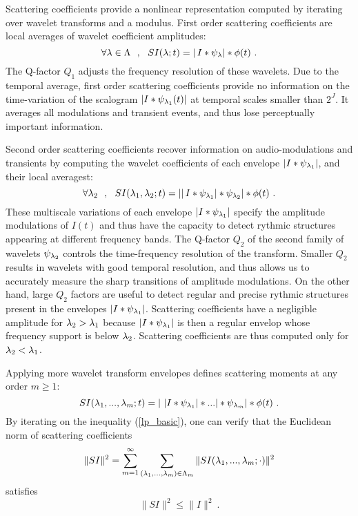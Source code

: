Scattering coefficients provide a nonlinear representation 
computed by 
iterating over wavelet transforms and a modulus. 
First order scattering coefficients
are local averages of wavelet coefficient amplitudes:
\[
\forall {\lambda} \in {\Lambda}~~,~~S I({\lambda}; t) = |\, I \ast \psi_{\lambda}| \ast \phi(t)~. 
\]
The Q-factor $Q_1$ adjusts the frequency resolution of 
these wavelets. Due to the temporal average, first order scattering coefficients 
provide no information on the time-variation of the scalogram
$|I \ast \psi_{{\lambda}_1} (t)|$ at temporal scales smaller than $2^J$. 
It averages all modulations and 
transient events, and thus lose perceptually important information.
 
Second order scattering coefficients recover information on
audio-modulations and transients by computing
the wavelet coefficients of each envelope $|I \ast \psi_{{\lambda}_1}|$, and their
local averagest:
\[
\forall {\lambda}_2~~,~~
S I({\lambda}_1,{\lambda}_2; t) = ||\, I \ast \psi_{{\lambda}_1}| \ast \psi_{{\lambda}_2}| \ast \phi(t)~ .
\]
These multiscale variations of each envelope $|I \ast \psi_{{\lambda}_1}|$ 
specify the amplitude modulations of $I(t)$ \cite{deepscatt} and 
thus have the capacity to detect rythmic structures appearing at different 
frequency bands. 
The Q-factor $Q_2$ of the second family of wavelets $\psi_{{\lambda}_2}$ 
controls the time-frequency resolution of the transform. Smaller $Q_2$ 
results in wavelets with good temporal resolution, and thus
allows us to accurately measure the sharp transitions of
amplitude modulations. On the other hand,  large $Q_2$ factors 
are useful to detect regular and precise rythmic structures present in the 
envelopes $| I \ast \psi_{{\lambda}_1}|$.
Scattering coefficients have a negligible amplitude for
${\lambda}_2 > {\lambda}_1$ because $|I \ast \psi_{{\lambda}_1}|$ is then a regular envelop
whose frequency support is below ${\lambda}_2$. Scattering coefficients are thus
computed only for ${\lambda}_2 < {\lambda}_1$. 

Applying more wavelet transform envelopes defines
scattering moments at any order $m \geq 1$:
\begin{equation}
\label{expansdf}
S I({\lambda}_1,...,{\lambda}_m; t) =  |~|I \ast \psi_{{\lambda}_1}| \ast ... | \ast \psi_{{\lambda}_m}| \ast \phi(t)~.
\end{equation}
By iterating on the inequality (\ref{lp_basic}), one can 
verify \cite{stephane}
that the Euclidean norm of scattering coefficients
\begin{equation}
\label{enfsondf}
\|S I\|^2 = \sum_{m=1}^{\infty} \sum_{({\lambda}_1,...,{\lambda}_m) \in {\Lambda}_m}
\|S I ({\lambda}_1,...,{\lambda}_m; \cdot )\|^2 
\end{equation}
satisfies
\[
\|S I\|^2 \leq  \| I \|^2~.
\]

